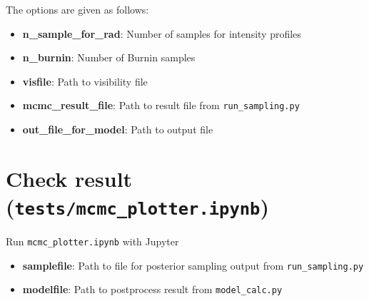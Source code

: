 \documentclass{report}
\begin{document}
The options are given as follows: 

\begin{itemize}
    \item \textbf{n\_sample\_for\_rad}: Number of samples for intensity profiles
    \item \textbf{n\_burnin}: Number of Burnin samples
    \item \textbf{visfile}: Path to visibility file
    \item \textbf{mcmc\_result\_file}: Path to result file from \texttt{run\_sampling.py} 
    \item \textbf{out\_file\_for\_model}: Path to output file 
\end{itemize}

\section{Check result (\texttt{tests/mcmc\_plotter.ipynb})}
Run \texttt{mcmc\_plotter.ipynb} with Jupyter
    \begin{itemize}
        \item \textbf{samplefile}: Path to file for posterior sampling output from \texttt{run\_sampling.py}
        \item \textbf{modelfile}: Path to postprocess result from \texttt{model\_calc.py}
    \end{itemize}


\end{document}
